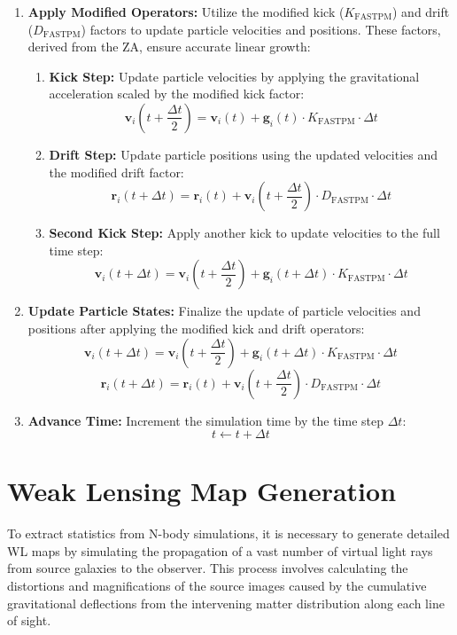 \begin{enumerate}
    \item \textbf{Apply Modified Operators:}
    \label{fastpm:modified-kick-drift}
    Utilize the modified kick ($K_{\text{FASTPM}}$) and drift ($D_{\text{FASTPM}}$) factors to update particle velocities and positions. These factors, derived from the ZA, ensure accurate linear growth:
    
    \begin{enumerate}
        \item \textbf{Kick Step:}
        Update particle velocities by applying the gravitational acceleration scaled by the modified kick factor:
        \[
        \mathbf{v}_i\left(t + \frac{\Delta t}{2}\right) = \mathbf{v}_i(t) + \mathbf{g}_i(t) \cdot K_{\text{FASTPM}} \cdot \Delta t
        \]
        
        \item \textbf{Drift Step:}
        Update particle positions using the updated velocities and the modified drift factor:
        \[
        \mathbf{r}_i(t + \Delta t) = \mathbf{r}_i(t) + \mathbf{v}_i\left(t + \frac{\Delta t}{2}\right) \cdot D_{\text{FASTPM}} \cdot \Delta t
        \]
        
        \item \textbf{Second Kick Step:}
        Apply another kick to update velocities to the full time step:
        \[
        \mathbf{v}_i(t + \Delta t) = \mathbf{v}_i\left(t + \frac{\Delta t}{2}\right) + \mathbf{g}_i(t + \Delta t) \cdot K_{\text{FASTPM}} \cdot \Delta t
        \]
    \end{enumerate}
    
    \item \textbf{Update Particle States:}
    Finalize the update of particle velocities and positions after applying the modified kick and drift operators:
    \[
    \mathbf{v}_i(t + \Delta t) = \mathbf{v}_i\left(t + \frac{\Delta t}{2}\right) + \mathbf{g}_i(t + \Delta t) \cdot K_{\text{FASTPM}} \cdot \Delta t
    \]
    \[
    \mathbf{r}_i(t + \Delta t) = \mathbf{r}_i(t) + \mathbf{v}_i\left(t + \frac{\Delta t}{2}\right) \cdot D_{\text{FASTPM}} \cdot \Delta t
    \]
    
    \item \textbf{Advance Time:}
    Increment the simulation time by the time step $\Delta t$:
    \[
    t \leftarrow t + \Delta t
    \]
\end{enumerate}

\section{Weak Lensing Map Generation}
\label{sec:weak-lensing-generation}
To extract statistics from N-body simulations, it is necessary to generate detailed WL maps by simulating the propagation of a vast number of virtual light rays from source galaxies to the observer. This process involves calculating the distortions and magnifications of the source images caused by the cumulative gravitational deflections from the intervening matter distribution along each line of sight.

